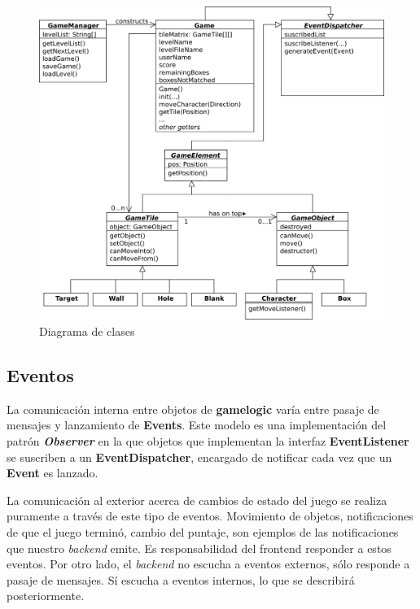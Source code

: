 \documentclass[a4paper,12pt,titlepage]{article}
\begin{document}
\begin{center}
	\begin{figure}[h]
		\center \includegraphics{ClassDiagram.png}
		\caption{Diagrama de clases}
	\end{figure}
\end{center}

\subsection{Eventos}

La comunicación interna entre objetos de \textbf{gamelogic} varía entre pasaje de mensajes y lanzamiento de \textbf{Events}. Este modelo es una implementación del patrón \textbf{\emph{Observer}} en la que objetos que implementan la interfaz \textbf{EventListener} se suscriben a un \textbf{EventDispatcher}, encargado de notificar cada vez que un \textbf{Event} es lanzado.

La comunicación al exterior acerca de cambios de estado del juego se realiza puramente a través de este tipo de eventos. Movimiento de objetos, notificaciones de que el juego terminó, cambio del puntaje, son ejemplos de las notificaciones que nuestro \emph{backend} emite. Es responsabilidad del frontend responder a estos eventos. Por otro lado, el \emph{backend} no escucha a eventos externos, sólo responde a pasaje de mensajes. Sí escucha a eventos internos, lo que se describirá posteriormente.
\end{document}
